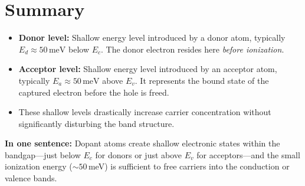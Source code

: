\documentclass[12pt]{article}
\begin{document}
	\section{Summary}
	\begin{itemize}
		\item \textbf{Donor level:} Shallow energy level introduced by a donor atom, typically \(E_d \approx 50\,\text{meV}\) below \(E_c\). The donor electron resides here \emph{before ionization}.
		\item \textbf{Acceptor level:} Shallow energy level introduced by an acceptor atom, typically \(E_a \approx 50\,\text{meV}\) above \(E_v\). It represents the bound state of the captured electron before the hole is freed.
		\item These shallow levels drastically increase carrier concentration without significantly disturbing the band structure.
	\end{itemize}
	
	\noindent
	\textbf{In one sentence:} 
	Dopant atoms create shallow electronic states within the bandgap---just below \(E_c\) for donors or just above \(E_v\) for acceptors---and the small ionization energy ($\sim50$\,meV) is sufficient to free carriers into the conduction or valence bands.
	
\end{document}
